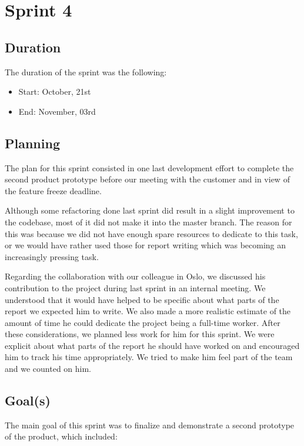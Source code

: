 
\chapter{Sprint 4}
\label{Sprint4}

\section{Duration}
The duration of the sprint was the following:
\begin{itemize}
\item Start: October, 21st
\item End: November, 03rd
\end{itemize}

\section{Planning}

The plan for this sprint consisted in one last development effort to complete the second product prototype before our meeting with the customer and in view of the feature freeze deadline.

Although some refactoring done last sprint did result in a slight improvement to the codebase, most of it did not make it into the master branch.
The reason for this was because we did not have enough spare resources to dedicate to this task, or we would have rather used those for report writing which was becoming an increasingly pressing task.

Regarding the collaboration with our colleague in Oslo, we discussed his contribution to the project during last sprint in an internal meeting.
We understood that it would have helped to be specific about what parts of the report we expected him to write. 
We also made a more realistic estimate of the amount of time he could dedicate the project being a full-time worker.
After these considerations, we planned less work for him for this sprint.
We were explicit about what parts of the report he should have worked on and encouraged him to track his time appropriately.
We tried to make him feel part of the team and we counted on him.

\section{Goal(s)}

The main goal of this sprint was to finalize and demonstrate a second prototype of the product, which included: 

